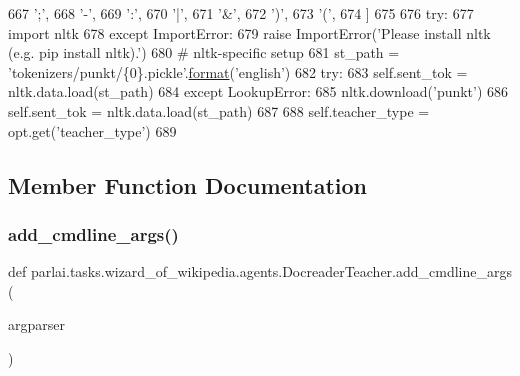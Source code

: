 \begin{DoxyCode}
667             \textcolor{stringliteral}{';'},
668             \textcolor{stringliteral}{'-'},
669             \textcolor{stringliteral}{':'},
670             \textcolor{stringliteral}{'|'},
671             \textcolor{stringliteral}{'&'},
672             \textcolor{stringliteral}{')'},
673             \textcolor{stringliteral}{'('},
674         ]
675 
676         \textcolor{keywordflow}{try}:
677             \textcolor{keyword}{import} nltk
678         \textcolor{keywordflow}{except} ImportError:
679             \textcolor{keywordflow}{raise} ImportError(\textcolor{stringliteral}{'Please install nltk (e.g. pip install nltk).'})
680         \textcolor{comment}{# nltk-specific setup}
681         st\_path = \textcolor{stringliteral}{'tokenizers/punkt/\{0\}.pickle'}.\hyperlink{namespaceparlai_1_1chat__service_1_1services_1_1messenger_1_1shared__utils_a32e2e2022b824fbaf80c747160b52a76}{format}(\textcolor{stringliteral}{'english'})
682         \textcolor{keywordflow}{try}:
683             self.sent\_tok = nltk.data.load(st\_path)
684         \textcolor{keywordflow}{except} LookupError:
685             nltk.download(\textcolor{stringliteral}{'punkt'})
686             self.sent\_tok = nltk.data.load(st\_path)
687 
688         self.teacher\_type = opt.get(\textcolor{stringliteral}{'teacher\_type'})
689 
\end{DoxyCode}


\subsection{Member Function Documentation}
\mbox{\label{classparlai_1_1tasks_1_1wizard__of__wikipedia_1_1agents_1_1DocreaderTeacher_a4c307fc0411f560ff9ccf0bdd8a794ef}} 
\subsubsection{\texorpdfstring{add\+\_\+cmdline\+\_\+args()}{add\_cmdline\_args()}}
{\footnotesize\ttfamily def parlai.\+tasks.\+wizard\+\_\+of\+\_\+wikipedia.\+agents.\+Docreader\+Teacher.\+add\+\_\+cmdline\+\_\+args (\begin{DoxyParamCaption}\item[{}]{argparser }\end{DoxyParamCaption})\hspace{0.3cm}{\ttfamily [static]}}




